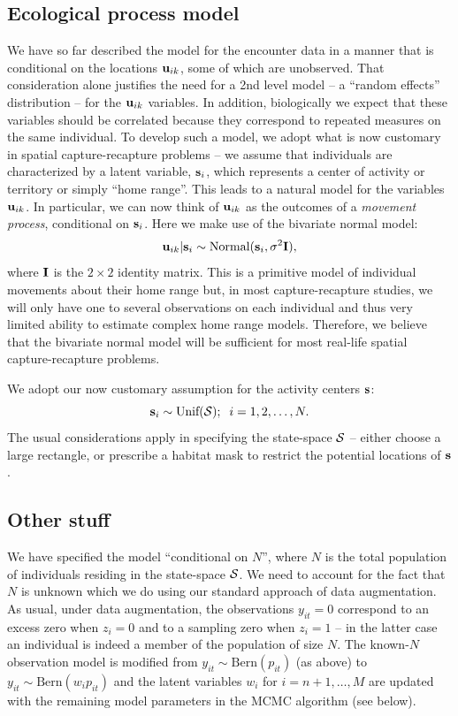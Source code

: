 \subsection{Ecological process model } 

We have so far described the model for the encounter data in a manner
that is conditional on the locations ${\bf u}_{ik}$, some of which are
unobserved. That consideration alone justifies the need for a 2nd
level model -- a ``random effects'' distribution -- for the ${\bf
  u}_{ik}$ variables. In addition, biologically we expect that these
variables should be correlated because they correspond to repeated
measures on the same individual.  To develop such a model, we adopt
what is now customary in spatial capture-recapture problems -- we
assume that individuals are characterized by a latent variable, ${\bf
  s}_{i}$, which represents a center of activity or territory or
simply ``home range''. This leads to a natural model for the variables
${\bf u}_{ik}$. In particular, we can now think of ${\bf u}_{ik}$ as
the outcomes of a {\it movement process}, conditional on ${\bf
  s}_{i}$. Here we make use of the bivariate normal model:
\[
 {\bf u}_{ik} | {\bf s}_{i} \sim \mbox{Normal}({\bf s}_{i}, \sigma^{2}{\bf I}),
\]
where ${\bf I}$ is the $2\times 2$ identity matrix.  This is a
primitive model of individual movements about their home range but, in
most capture-recapture studies, we will only have one to several
observations on each individual and thus very limited ability to
estimate complex home range models. Therefore, we believe that the
bivariate normal model will be sufficient for most real-life spatial
capture-recapture problems.

We adopt our now customary assumption for the activity centers ${\bf s}$:
\[
 {\bf s}_{i} \sim \mbox{Unif}({\cal S}); \; \; i=1,2,\ldots,N.
\]
The usual considerations apply in specifying the state-space ${\cal
  S}$ -- either choose a large rectangle, or prescribe a habitat mask
to restrict the potential locations of ${\bf s}$.




\subsection{Other stuff}

We have specified the model ``conditional on $N$'', where $N$
is the total population of individuals residing in the state-space
${\cal S}$. We need to account for the fact that $N$ is unknown which
we do using our standard approach of data augmentation. 
As usual, under data augmentation, the
observations $y_{it}=0$
correspond to an excess zero when $z_{i}=0$ and to a sampling
zero when $z_{i}=1$ -- in the latter case an
individual is indeed a member of the population of size $N$. The known-$N$ observation model is
modified from $y_{it} \sim \mbox{Bern}(p_{it})$ (as above) to $y_{it}
\sim \mbox{Bern}(w_{i} p_{it})$ and the latent variables $w_{i}$ for
$i=n+1,\ldots,M$ are updated with the remaining model parameters in
the MCMC algorithm (see below). 

